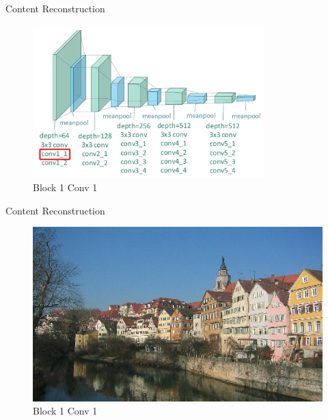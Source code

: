 \documentclass{beamer}
\begin{document}
\begin{frame}{Content Reconstruction}
\begin{figure}[ht]
\centering
\includegraphics[width=0.8\textwidth]{img/vgg19/content/block1_conv1}
\caption{Block 1 Conv 1}
\end{figure}
\end{frame}

\begin{frame}{Content Reconstruction}
\begin{figure}[ht]
\centering
\includegraphics[width=.9\textwidth]{img/content/block1_conv1.png}
\caption{Block 1 Conv 1}
\end{figure}
\end{frame}
\end{document}
